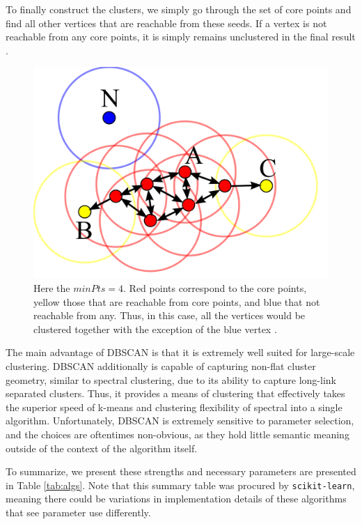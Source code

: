 \documentclass{article}
\begin{document}
To finally construct the clusters, we simply go through the set of core points and find all other vertices that are reachable from these seeds. If a vertex is not reachable from any core points, it is simply remains unclustered in the final result \cite{dbscan}.

\begin{figure}
    \centering
    \includegraphics[width=.50\textwidth]{dbscan.png}
    \caption[DBSCAN Clustering]{Here the $minPts=4$. Red points correspond to the core points, yellow those that are reachable from core points, and blue that not reachable from any. Thus, in this case, all the vertices would be clustered together with the exception of the blue vertex \cite{wiki-dbscan}.}
    \label{fig:dbscan}
\end{figure}

The main advantage of DBSCAN is that it is extremely well suited for large-scale clustering. DBSCAN additionally is capable of capturing non-flat cluster geometry, similar to spectral clustering, due to its ability to capture long-link separated clusters. Thus, it provides a means of clustering that effectively takes the superior speed of k-means and clustering flexibility of spectral into a single algorithm. Unfortunately, DBSCAN is extremely sensitive to parameter selection, and the choices are oftentimes non-obvious, as they hold little semantic meaning outside of the context of the algorithm itself.

To summarize, we present these strengths and necessary parameters are presented in Table \ref{tab:algs}. Note that this summary table was procured by \texttt{scikit-learn}, meaning there could be variations in implementation details of these algorithms that see parameter use differently.
\end{document}

